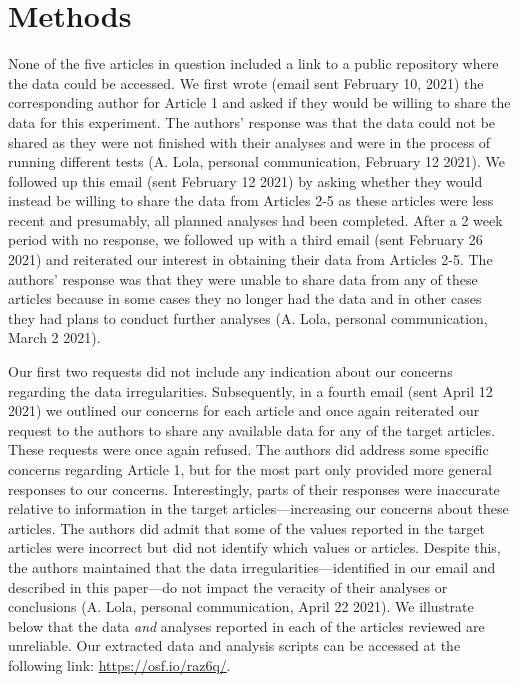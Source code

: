 \documentclass[
  english,
  man, donotrepeattitle,floatsintext]{apa7}
\begin{document}
\hypertarget{methods}{%
\section{Methods}\label{methods}}

None of the five articles in question included a link to a public repository where the data could be accessed. We first wrote (email sent February 10, 2021) the corresponding author for Article 1 and asked if they would be willing to share the data for this experiment. The authors' response was that the data could not be shared as they were not finished with their analyses and were in the process of running different tests (A. Lola, personal communication, February 12 2021). We followed up this email (sent February 12 2021) by asking whether they would instead be willing to share the data from Articles 2-5 as these articles were less recent and presumably, all planned analyses had been completed. After a 2 week period with no response, we followed up with a third email (sent February 26 2021) and reiterated our interest in obtaining their data from Articles 2-5. The authors' response was that they were unable to share data from any of these articles because in some cases they no longer had the data and in other cases they had plans to conduct further analyses (A. Lola, personal communication, March 2 2021).

Our first two requests did not include any indication about our concerns regarding the data irregularities. Subsequently, in a fourth email (sent April 12 2021) we outlined our concerns for each article and once again reiterated our request to the authors to share any available data for any of the target articles. These requests were once again refused. The authors did address some specific concerns regarding Article 1, but for the most part only provided more general responses to our concerns. Interestingly, parts of their responses were inaccurate relative to information in the target articles---increasing our concerns about these articles. The authors did admit that some of the values reported in the target articles were incorrect but did not identify which values or articles. Despite this, the authors maintained that the data irregularities---identified in our email and described in this paper---do not impact the veracity of their analyses or conclusions (A. Lola, personal communication, April 22 2021). We illustrate below that the data \emph{and} analyses reported in each of the articles reviewed are unreliable. Our extracted data and analysis scripts can be accessed at the following link: \url{https://osf.io/raz6q/}.
\end{document}
